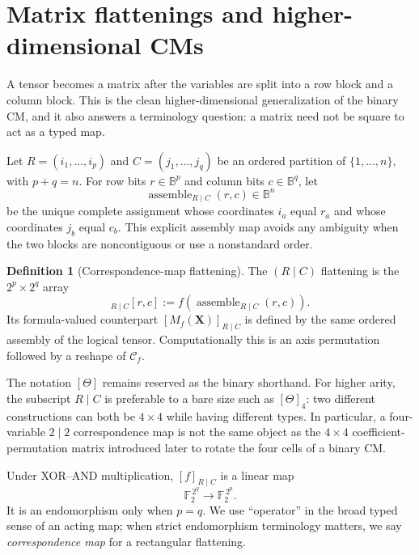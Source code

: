 \documentclass[11pt]{article}
\theoremstyle{definition}
\newtheorem{definition}[theorem]{Definition}
\theoremstyle{remark}
\newcommand{\B}{\mathbb B}
\newcommand{\F}{\mathbb F}
\newcommand{\cC}{\mathcal C}
\begin{document}
\section{Matrix flattenings and higher-dimensional CMs}
\label{sec:flatten}

A tensor becomes a matrix after the variables are split into a row block and a column block.  This is the clean higher-dimensional generalization of the binary CM, and it also answers a terminology question: a matrix need not be square to act as a typed map.

Let $R=(i_1,\ldots,i_p)$ and $C=(j_1,\ldots,j_q)$ be an ordered partition of $\{1,\ldots,n\}$, with $p+q=n$.  For row bits $r\in\B^p$ and column bits $c\in\B^q$, let
\[
 \operatorname{assemble}_{R\mid C}(r,c)\in\B^n
\]
be the unique complete assignment whose coordinates $i_a$ equal $r_a$ and whose coordinates $j_b$ equal $c_b$.  This explicit assembly map avoids any ambiguity when the two blocks are noncontiguous or use a nonstandard order.

\begin{definition}[Correspondence-map flattening]
The $(R\mid C)$ flattening is the $2^p\times2^q$ array
\begin{equation}
 [f]_{R\mid C}[r,c]
 :=f\!\left(\operatorname{assemble}_{R\mid C}(r,c)\right).
 \label{eq:flattening}
\end{equation}
Its formula-valued counterpart $[M_f(\mathbf X)]_{R\mid C}$ is defined by the same ordered assembly of the logical tensor.  Computationally this is an axis permutation followed by a reshape of $\cC_f$.
\end{definition}

The notation $[\Theta]$ remains reserved as the binary shorthand.  For higher arity, the subscript $R\mid C$ is preferable to a bare size such as $[\Theta]_4$: two different constructions can both be $4\times4$ while having different types.  In particular, a four-variable $2\mid2$ correspondence map is not the same object as the $4\times4$ coefficient-permutation matrix introduced later to rotate the four cells of a binary CM.

Under XOR--AND multiplication, $[f]_{R\mid C}$ is a linear map
\[
 \F_2^{\,2^q}\longrightarrow\F_2^{\,2^p}.
\]
It is an endomorphism only when $p=q$.  We use ``operator'' in the broad typed sense of an acting map; when strict endomorphism terminology matters, we say \emph{correspondence map} for a rectangular flattening.
\end{document}

